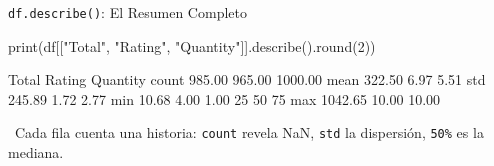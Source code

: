 \documentclass[aspectratio=169, 11pt]{beamer}
\begin{document}
\begin{frame}[fragile,shrink=28]{\texttt{df.describe()}: El Resumen Completo}
  \vspace{-6pt}
  \begin{pyblock}
print(df[["Total", "Rating", "Quantity"]].describe().round(2))
  \end{pyblock}

  \vspace{2pt}
  \begin{outputblock}[minted options={fontsize=\scriptsize, breaklines}]
         Total   Rating  Quantity
count   985.00   965.00   1000.00
mean    322.50     6.97      5.51
std     245.89     1.72      2.77
min      10.68     4.00      1.00
25%
50%
75%
max    1042.65    10.00     10.00
  \end{outputblock}

  \vspace{4pt}
  {\scriptsize\color{textMuted}
    \faArrowRight\ Cada fila cuenta una historia: \texttt{count} revela NaN,
    \texttt{std} la dispersión, \texttt{50\%} es la mediana.}
\end{frame}
\end{document}
